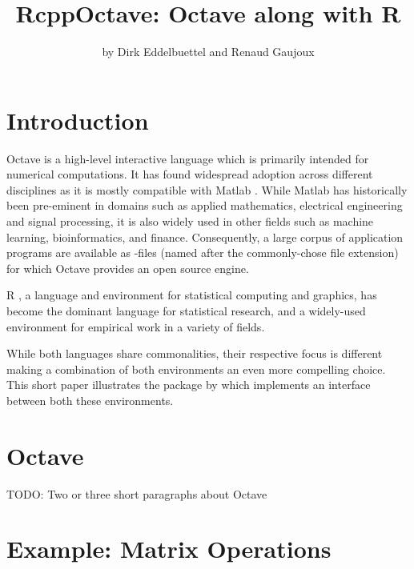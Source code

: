 \title{RcppOctave: Octave along with R}  %
\author{by Dirk Eddelbuettel and Renaud Gaujoux}

\maketitle


\section{Introduction}

Octave \citep{Eaton:2008} is a high-level interactive language which is
primarily intended for numerical computations.  It has found widespread
adoption across different disciplines as it is mostly compatible with Matlab
\citep{MATLAB:2010}.  While Matlab has historically been pre-eminent in
domains such as applied mathematics, electrical engineering and signal
processing, it is also widely used in other fields such as machine
learning, %
bioinformatics, and finance.  Consequently, a large corpus of application
programs are available as -files (named after the commonly-chose
file extension) for which Octave provides an open source engine.

R \citep{R:2012}, a language and environment for statistical
computing and graphics, has become the dominant language for statistical
research, and a widely-used environment for empirical work in a variety of
fields. %

While both languages share commonalities, their respective focus is different
making a combination of both environments an even more compelling choice.
This short paper illustrates the  package by
\cite{CRAN:RcppOctave} which implements an interface between both these
environments.

\section{Octave}

TODO: Two or three short paragraphs about Octave

\section{Example: Matrix Operations}  %

